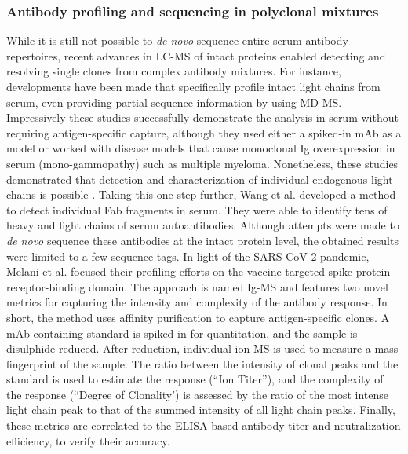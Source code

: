\subsubsection{Antibody profiling and sequencing in polyclonal mixtures}
While it is still not possible to \emph{de novo} sequence entire serum antibody repertoires, recent advances in LC-MS of intact proteins enabled detecting and resolving single clones from complex antibody mixtures.
For instance, developments have been made that specifically profile intact light chains from serum, even providing partial sequence information by using MD MS. Impressively these studies successfully demonstrate the analysis in serum without requiring antigen-specific capture, although they used either a spiked-in mAb as a model or worked with disease models that cause monoclonal Ig overexpression in serum (mono-gammopathy) such as multiple myeloma. Nonetheless, these studies demonstrated that detection and characterization of individual endogenous light chains is possible \cite{he2017analysis, he2019classification, mills2015detecting, sharpley2019novel, dupré2021de}. Taking this one step further, Wang et al. \cite{wang2019top-down} developed a method to detect individual Fab fragments in serum. They were able to identify tens of heavy and light chains of serum autoantibodies. Although attempts were made to \emph{de novo} sequence these antibodies at the intact protein level, the obtained results were limited to a few sequence tags. In light of the SARS-CoV-2 pandemic, Melani et al. \cite{melani2022next-generation} focused their profiling efforts on the vaccine-targeted spike protein receptor-binding domain. The approach is named Ig-MS and features two novel metrics for capturing the intensity and complexity of the antibody response. In short, the method uses affinity purification to capture antigen-specific clones. A mAb-containing standard is spiked in for quantitation, and the sample is disulphide-reduced. After reduction, individual ion MS \cite{kafader2020multiplexed} is used to measure a mass fingerprint of the sample. The ratio between the intensity of clonal peaks and the standard is used to estimate the response (“Ion Titer”), and the complexity of the response (“Degree of Clonality’) is assessed by the ratio of the most intense light chain peak to that of the summed intensity of all light chain peaks. Finally, these metrics are correlated to the ELISA-based antibody titer and neutralization efficiency, to verify their accuracy.
